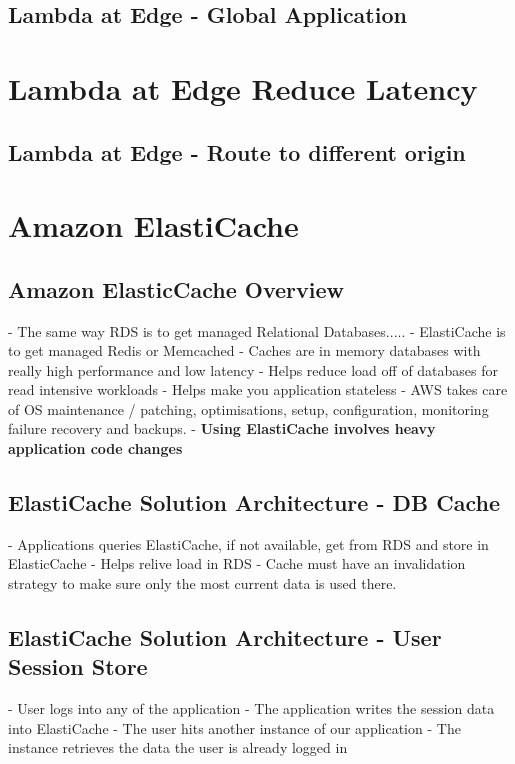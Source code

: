 \documentclass[11pt]{book}
\begin{document}
    \subsection{Lambda at Edge - Global Application}


    \section{Lambda at Edge Reduce Latency}

    \subsection{Lambda at Edge - Route to different origin}


    \section{Amazon ElastiCache}

    \subsection{Amazon ElasticCache Overview}
    - The same way RDS is to get managed Relational Databases.....
    - ElastiCache is to get managed Redis or Memcached
    - Caches are in memory databases with really high performance and low latency
    - Helps reduce load off of databases for read intensive workloads
    - Helps make you application stateless
    - AWS takes care of OS maintenance / patching, optimisations, setup, configuration, monitoring failure recovery and backups.
    - \textbf{Using ElastiCache involves heavy application code changes}

    \subsection{ElastiCache Solution Architecture - DB Cache}
    - Applications queries ElastiCache, if not available, get from RDS and store in ElasticCache
    - Helps relive load in RDS
    - Cache must have an invalidation strategy to make sure only the most current data is used there.

    \subsection{ElastiCache Solution Architecture - User Session Store}
    - User logs into any of the application
    - The application writes the session data into ElastiCache
    - The user hits another instance of our application
    - The instance retrieves the data the user is already logged in
\end{document}
